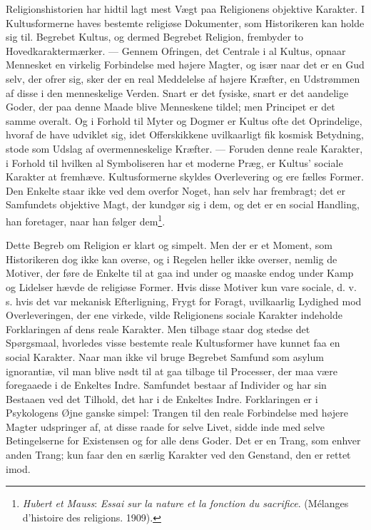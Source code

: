\documentclass[12pt,a4paper]{book}
\newcommand{\apage}[1]{\marginnote{\footnotesize\textit{[#1]}}}
\begin{document}
Religionshistorien har hidtil lagt mest Vægt paa Religionens objektive Karakter. I
Kultusformerne haves bestemte religiøse Dokumenter, som Historikeren kan holde sig til.
Begrebet Kultus, og dermed Begrebet Religion, frembyder to Hovedkaraktermærker. --- Gennem
Ofringen, det Centrale i al Kultus, opnaar Mennesket en virkelig Forbindelse med højere
Magter, og især naar det er en Gud selv, der ofrer sig, sker der en real Meddelelse af
højere Kræfter, en Udstrømmen af disse i den menneskelige Verden. Snart er det fysiske,
snart er det aandelige Goder, der paa denne Maade blive Menneskene tildel; men Principet er det samme overalt. Og i Forhold til Myter og Dogmer er Kultus ofte det Oprindelige, hvoraf
de have udviklet sig, idet Offerskikkene uvilkaarligt fik kosmisk Betydning, stode som Udslag
af overmenneskelige Kræfter. --- Foruden denne reale Karakter, i Forhold til hvilken al Symboliseren har et moderne Præg, er Kultus' sociale Karakter at fremhæve. Kultusformerne
skyldes Overlevering og ere fælles Former. Den Enkelte staar ikke ved dem overfor Noget, han
selv har frembragt; det er Samfundets objektive Magt, der kundgør sig i dem, og det er en
social Handling, han foretager, naar han følger dem\footnote{\emph{Hubert et Mauss}:
\emph{Essai sur la nature et la fonction du sacrifice}. (Mélanges d'histoire des religions.
1909).}.

\apage{372} Dette Begreb om Religion er klart og simpelt. Men der er et Moment, som Historikeren dog
ikke kan overse, og i Regelen heller ikke overser, nemlig de Motiver, der føre de Enkelte
til at gaa ind under og maaske endog under Kamp og Lidelser hævde de religiøse Former. Hvis
disse Motiver kun vare sociale, d. v. s. hvis det var mekanisk Efterligning, Frygt for
Foragt, uvilkaarlig Lydighed mod Overleveringen, der ene virkede, vilde Religionens sociale
Karakter indeholde Forklaringen af dens reale Karakter. Men tilbage staar dog stedse det
Spørgsmaal, hvorledes visse bestemte reale Kultusformer have kunnet faa en social Karakter.
Naar man ikke vil bruge Begrebet Samfund som asylum ignorantiæ, vil man blive nødt til at
gaa tilbage til Processer, der maa være foregaaede i de Enkeltes Indre. Samfundet bestaar af
Individer og har sin Bestaaen ved det Tilhold, det har i de Enkeltes Indre. Forklaringen er
i Psykologens Øjne ganske simpel: Trangen til den reale Forbindelse med højere Magter
udspringer af, at disse raade for selve Livet, sidde inde med selve Betingelserne for
Existensen og for alle dens Goder. Det er en Trang, som enhver anden Trang; kun faar den en
særlig Karakter ved den Genstand, den er rettet imod.
\end{document}
